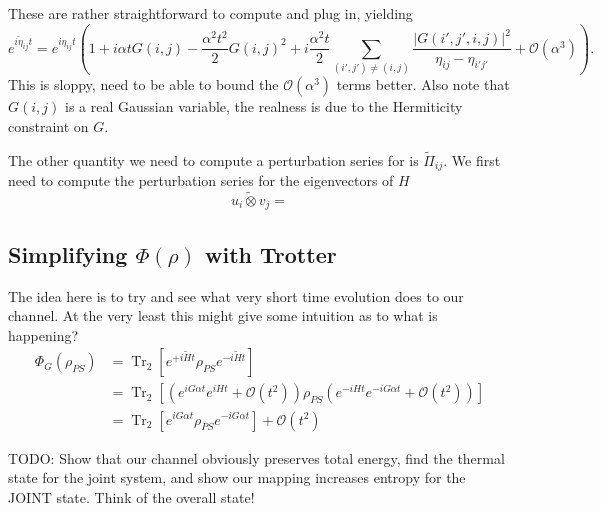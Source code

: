 \documentclass{article}
\newcommand{\parens}[1]{\left( #1 \right)}
\newcommand{\brackets}[1]{\left[ #1 \right]}
\newcommand{\abs}[1]{\left| #1 \right|}
\newcommand{\bigo}[1]{\mathcal{O}\left( #1 \right)}
\DeclareMathOperator{\Tr}{Tr}
\newcommand{\partrace}[2]{\Tr_{#1} \brackets{ #2 }}
\begin{document}
These are rather straightforward to compute and plug in, yielding
\begin{equation}
    e^{i \widetilde{\eta}_{ij} t} = e^{i \eta_{ij} t}\parens{1 + i \alpha t G(i,j) - \frac{\alpha^2 t^2}{2} G(i,j)^2 + i \frac{\alpha^2 t}{2} \sum_{(i',j') \neq (i,j)}\frac{\abs{G(i',j',i,j)}^2}{\eta_{ij} - \eta_{i' j'}} + \bigo{\alpha^3}}.
\end{equation}
This is sloppy, need to be able to bound the $\bigo{\alpha^3}$ terms better. Also note that $G(i,j)$ is a real Gaussian variable, the realness is due to the Hermiticity constraint on $G$. 

The other quantity we need to compute a perturbation series for is $\widetilde{\Pi}_{ij}$. We first need to compute the perturbation series for the eigenvectors of $H$ 
\begin{equation}
    \widetilde{u_i \otimes v_j} = 
\end{equation}

\subsection{Simplifying $\Phi(\rho)$ with Trotter}
The idea here is to try and see what very short time evolution does to our channel. At the very least this might give some intuition as to what is happening?
\begin{align}
    \Phi_G(\rho_{PS}) &= \partrace{2}{e^{+i\widetilde{H}t} \rho_{PS} e^{-i \widetilde{H} t}} \\
    &= \partrace{2}{\parens{e^{i G \alpha t} e^{i H t} + \bigo{t^2}} \rho_{PS} \parens{e^{-iHt} e^{-i G \alpha t} + \bigo{t^2}}} \\
    &= \partrace{2}{e^{i G \alpha t} \rho_{PS} e^{-i G \alpha t}} + \bigo{t^2} 
\end{align}

TODO: Show that our channel obviously preserves total energy, find the thermal state for the joint system, and show our mapping increases entropy for the JOINT state. Think of the overall state!


\end{document}
